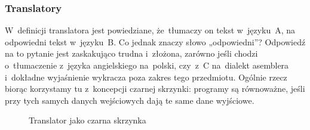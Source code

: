 \documentclass[10pt,t]{beamer}
\begin{document}
\begin{frame}
  \frametitle{Translatory}


  W~definicji translatora jest powiedziane, że~tłumaczy on tekst
  w~języku~A, na \alert{odpowiedni} tekst w~języku~B. Co jednak znaczy
  słowo „odpowiedni”? Odpowiedź na to pytanie jest zaskakująco trudna
  i~złożona, zarówno jeśli chodzi o~tłumaczenie z~języka angielskiego
  na~polski, czy~z~C na~dialekt asemblera i~dokładne wyjaśnienie wykracza
  poza zakres tego przedmiotu. Ogólnie rzecz biorąc korzystamy tu
  z~koncepcji czarnej skrzynki: programy są równoważne, jeśli przy tych
  samych danych wejściowych dają te same dane wyjściowe.%



  \begin{figure}

    \label{fig:Translator-03}


    \caption{Translator jako czarna skrzynka}


  \end{figure}

\end{frame}
\end{document}
